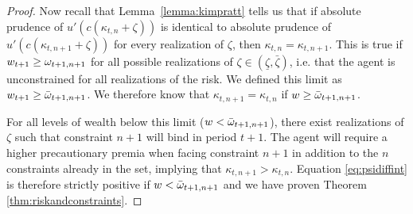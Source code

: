 \begin{proof}
	Now recall that Lemma~\ref{lemma:kimpratt} tells us that if absolute prudence of $u'(c(\kappa_{t,n}+\zeta))$ is identical to absolute prudence of $u'({c}(\kappa_{t,n+1}+\zeta))$ for every realization of $\zeta$, then $\kappa_{t,n}=\kappa_{t,n+1}$. This is true if $w_{t+1} \geq \omega_{t+1,n+1}$ for all possible realizations of $\zeta \in (\underline{\zeta}, \bar{\zeta})$, i.e. that the agent is unconstrained for all realizations of the risk. We defined this limit as $w_{t+1} \geq {\bar{\omega}}_{t+1,n+1}$. We therefore know that $\kappa_{t,n+1}  = \kappa_{t,n}$ if ${w} \geq {\bar{\omega}}_{t+1,n+1}$.
	
	For all levels of wealth below this limit (${w} < {\bar{\omega}}_{t+1,n+1}$), there exist realizations of $\zeta$ such that constraint $n+1$ will bind in period $t+1$. The agent will require a higher precautionary premia when facing constraint $n+1$ in addition to the $n$ constraints already in the set, implying that $\kappa_{t,n+1} > \kappa_{t,n}$. Equation \eqref{eq:psidiffint} is therefore strictly positive if ${w} < {\bar{\omega}}_{t+1,n+1}$ and we have proven Theorem \ref{thm:riskandconstraints}.
	

\end{proof}
